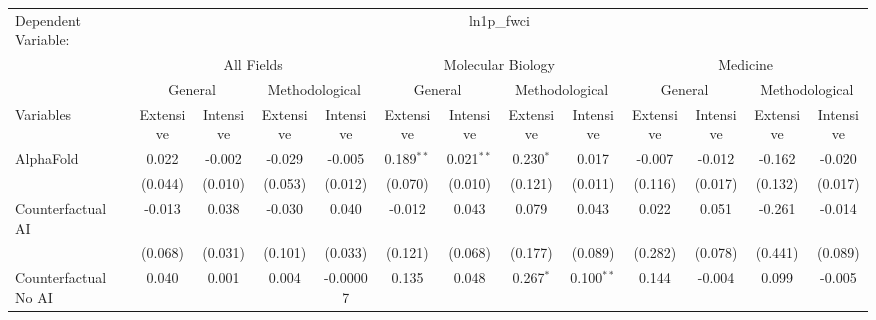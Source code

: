 \begingroup
\centering
\begin{tabular}{lcccccccccccc}
   \tabularnewline \midrule \midrule
   Dependent Variable: & \multicolumn{12}{c}{ln1p\_fwci}\\
 & \multicolumn{4}{c}{All Fields} & \multicolumn{4}{c}{Molecular Biology} & \multicolumn{4}{c}{Medicine} \\
\cmidrule(lr){2-5} \cmidrule(lr){6-9} \cmidrule(lr){10-13}
 & \multicolumn{2}{c}{General} & \multicolumn{2}{c}{Methodological} & \multicolumn{2}{c}{General} & \multicolumn{2}{c}{Methodological} & \multicolumn{2}{c}{General} & \multicolumn{2}{c}{Methodological} \\
\cmidrule(lr){2-3} \cmidrule(lr){4-5} \cmidrule(lr){6-7} \cmidrule(lr){8-9} \cmidrule(lr){10-11} \cmidrule(lr){12-13}
Variables & \multicolumn{1}{c}{Extensive} & \multicolumn{1}{c}{Intensive} & \multicolumn{1}{c}{Extensive} & \multicolumn{1}{c}{Intensive} & \multicolumn{1}{c}{Extensive} & \multicolumn{1}{c}{Intensive} & \multicolumn{1}{c}{Extensive} & \multicolumn{1}{c}{Intensive} & \multicolumn{1}{c}{Extensive} & \multicolumn{1}{c}{Intensive} & \multicolumn{1}{c}{Extensive} & \multicolumn{1}{c}{Intensive} \\
\cmidrule(lr){1-1}\cmidrule(lr){2-2} \cmidrule(lr){3-3} \cmidrule(lr){4-4} \cmidrule(lr){5-5} \cmidrule(lr){6-6} \cmidrule(lr){7-7} \cmidrule(lr){8-8} \cmidrule(lr){9-9} \cmidrule(lr){10-10} \cmidrule(lr){11-11} \cmidrule(lr){12-12} \cmidrule(lr){13-13}
   AlphaFold                                & 0.022         & -0.002   & -0.029       & -0.005   & 0.189$^{**}$ & 0.021$^{**}$ & 0.230$^{*}$ & 0.017        & -0.007       & -0.012  & -0.162      & -0.020\\   
                                            & (0.044)       & (0.010)  & (0.053)      & (0.012)  & (0.070)      & (0.010)      & (0.121)     & (0.011)      & (0.116)      & (0.017) & (0.132)     & (0.017)\\   
   Counterfactual AI                        & -0.013        & 0.038    & -0.030       & 0.040    & -0.012       & 0.043        & 0.079       & 0.043        & 0.022        & 0.051   & -0.261      & -0.014\\   
                                            & (0.068)       & (0.031)  & (0.101)      & (0.033)  & (0.121)      & (0.068)      & (0.177)     & (0.089)      & (0.282)      & (0.078) & (0.441)     & (0.089)\\   
   Counterfactual No AI                     & 0.040         & 0.001    & 0.004        & -0.00007 & 0.135        & 0.048        & 0.267$^{*}$ & 0.100$^{**}$ & 0.144        & -0.004  & 0.099       & -0.005\\   

\end{tabular}

